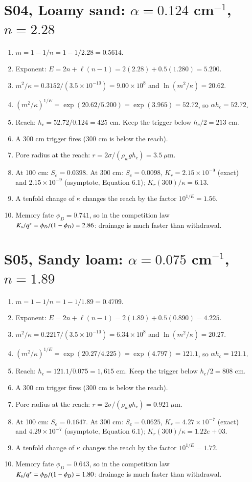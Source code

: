 \section{S04, Loamy sand: $\alpha=0.124$ cm$^{-1}$, $n=2.28$}
\begin{enumerate}[leftmargin=*,itemsep=1pt]
\item $m=1-1/n=1-1/2.28=0.5614$.
\item Exponent: $E=2n+\ell(n-1)=2(2.28)+0.5(1.280)=5.200$.
\item $m^2/\kappa=0.3152/(3.5\times10^{-10})=9.00\times10^{8}$ and $\ln(m^2/\kappa)=20.62$.
\item $(m^2/\kappa)^{1/E}=\exp(20.62/5.200)=\exp(3.965)=52.72$, so $\alpha h_c=52.72$.
\item Reach: $h_c=52.72/0.124=425$ cm. Keep the trigger below $h_c/2=213$ cm.
\item A 300 cm trigger fires (300 cm is below the reach).
\item Pore radius at the reach: $r=2\sigma/(\rho_wgh_c)=3.5\ \mu$m.
\item At 100 cm: $S_e=0.0398$. At 300 cm: $S_e=0.0098$, $K_r=2.15\times10^{-9}$ (exact) and $2.15\times10^{-9}$ (asymptote, Equation 6.1); $K_r(300)/\kappa=6.13$.
\item A tenfold change of $\kappa$ changes the reach by the factor $10^{1/E}=1.56$.
\item Memory fate $\phi_D=0.741$, so in the competition law $K_{\mathrm s}/q^*=\phi_D/(1-\phi_D)=2.86$: drainage is much faster than withdrawal.
\end{enumerate}
\section{S05, Sandy loam: $\alpha=0.075$ cm$^{-1}$, $n=1.89$}
\begin{enumerate}[leftmargin=*,itemsep=1pt]
\item $m=1-1/n=1-1/1.89=0.4709$.
\item Exponent: $E=2n+\ell(n-1)=2(1.89)+0.5(0.890)=4.225$.
\item $m^2/\kappa=0.2217/(3.5\times10^{-10})=6.34\times10^{8}$ and $\ln(m^2/\kappa)=20.27$.
\item $(m^2/\kappa)^{1/E}=\exp(20.27/4.225)=\exp(4.797)=121.1$, so $\alpha h_c=121.1$.
\item Reach: $h_c=121.1/0.075=1,615$ cm. Keep the trigger below $h_c/2=808$ cm.
\item A 300 cm trigger fires (300 cm is below the reach).
\item Pore radius at the reach: $r=2\sigma/(\rho_wgh_c)=0.921\ \mu$m.
\item At 100 cm: $S_e=0.1647$. At 300 cm: $S_e=0.0625$, $K_r=4.27\times10^{-7}$ (exact) and $4.29\times10^{-7}$ (asymptote, Equation 6.1); $K_r(300)/\kappa=1.22e+03$.
\item A tenfold change of $\kappa$ changes the reach by the factor $10^{1/E}=1.72$.
\item Memory fate $\phi_D=0.643$, so in the competition law $K_{\mathrm s}/q^*=\phi_D/(1-\phi_D)=1.80$: drainage is much faster than withdrawal.
\end{enumerate}
